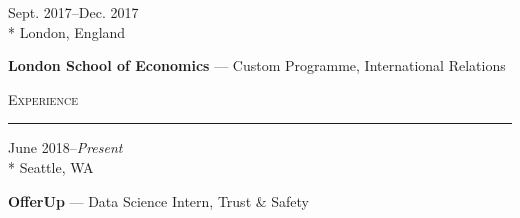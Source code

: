 \documentclass[a4paper,9pt]{article}
\begin{document}
\vspace{-3ex}
\begin{minipage}[t]{0.20\linewidth}
	\begin{small}
		\begin{spacing}{1.00}
			\begin{flushright}
				Sept. 2017--Dec. 2017
				\\*
				\vspace*{2.5pt}
				London, England
			\end{flushright}
		\end{spacing}
	\end{small}
\end{minipage}
\hspace{4mm}
\begin{minipage}[t]{0.75\linewidth}
	\begin{small}
		\begin{spacing}{1.00}
			\begin{flushleft}
				\textbf{London School of Economics} --- Custom Programme, International Relations
			\end{flushleft}
		\end{spacing}
	\end{small}
\end{minipage}

\vspace{-6ex}
\vspace*{25pt}

\begin{Large}
	\textsc{Experience}
\end{Large}
\vspace*{5pt}
\hrule
\vspace*{5pt}

\vspace{1ex}	
\begin{minipage}[t]{0.20\linewidth}
	\begin{small}
		\begin{spacing}{1.00}
			\begin{flushright}
				June 2018--\textit{Present}
				\\*
				\vspace*{2.5pt}
				Seattle, WA
			\end{flushright}
		\end{spacing}
	\end{small}
\end{minipage}
\hspace{4mm}
\begin{minipage}[t]{0.75\linewidth}
	\begin{small}
		\begin{spacing}{1.00}
			\begin{flushleft}
				\textbf{OfferUp} --- Data Science Intern, Trust \& Safety
			\end{flushleft}
		\end{spacing}
	\end{small}
\end{minipage}
\end{document}
